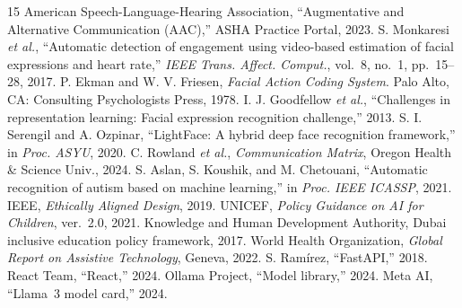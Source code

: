 \documentclass[conference]{IEEEtran}
\begin{document}
\balance
\begin{thebibliography}{15}
 American Speech-Language-Hearing Association, ``Augmentative and Alternative Communication (AAC),'' ASHA Practice Portal, 2023.
 S. Monkaresi \emph{et al.}, ``Automatic detection of engagement using video-based estimation of facial expressions and heart rate,'' \emph{IEEE Trans. Affect. Comput.}, vol.~8, no.~1, pp.~15--28, 2017.
 P. Ekman and W. V. Friesen, \emph{Facial Action Coding System}. Palo Alto, CA: Consulting Psychologists Press, 1978.
 I. J. Goodfellow \emph{et al.}, ``Challenges in representation learning: Facial expression recognition challenge,'' 2013.
 S. I. Serengil and A. Ozpinar, ``LightFace: A hybrid deep face recognition framework,'' in \emph{Proc. ASYU}, 2020.
 C. Rowland \emph{et al.}, \emph{Communication Matrix}, Oregon Health \& Science Univ., 2024.
 S. Aslan, S. Koushik, and M. Chetouani, ``Automatic recognition of autism based on machine learning,'' in \emph{Proc. IEEE ICASSP}, 2021.
 IEEE, \emph{Ethically Aligned Design}, 2019.
 UNICEF, \emph{Policy Guidance on AI for Children}, ver.~2.0, 2021.
 Knowledge and Human Development Authority, Dubai inclusive education policy framework, 2017.
 World Health Organization, \emph{Global Report on Assistive Technology}, Geneva, 2022.
 S. Ram\'irez, ``FastAPI,'' 2018.
 React Team, ``React,'' 2024.
 Ollama Project, ``Model library,'' 2024.
 Meta AI, ``Llama~3 model card,'' 2024.
\end{thebibliography}
\end{document}
